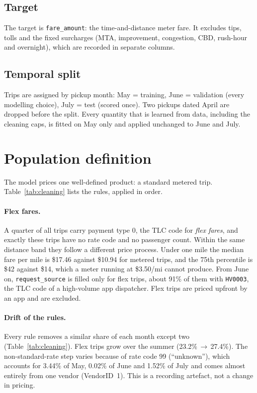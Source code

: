 \documentclass[11pt,a4paper]{article}
\newcommand{\usd}[1]{\$#1}%
\newcommand{\code}[1]{\texttt{#1}}
\begin{document}
\subsection{Target}
The target is \code{fare\_amount}: the time-and-distance meter fare. It excludes tips, tolls and the fixed surcharges (MTA, improvement, congestion, CBD, rush-hour and overnight), which are recorded in separate columns.

\subsection{Temporal split}
Trips are assigned by pickup month: May = training, June = validation (every modelling choice), July = test (scored once). Two pickups dated April are dropped before the split. Every quantity that is learned from data, including the cleaning caps, is fitted on May only and applied unchanged to June and July.

\section{Population definition}\label{sec:population}
The model prices one well-defined product: a standard metered trip. Table~\ref{tab:cleaning} lists the rules, applied in order.
\TableCleaning

\paragraph{Flex fares.} A quarter of all trips carry payment type 0, the TLC code for \emph{flex fares}, and exactly these trips have no rate code and no passenger count. Within the same distance band they follow a different price process. Under one mile the median fare per mile is \usd{17.46} against \usd{10.94} for metered trips, and the 75th percentile is \usd{42} against \usd{14}, which a meter running at \usd{3.50}/mi cannot produce. From June on, \code{request\_source} is filled only for flex trips, about 91\% of them with \code{HV0003}, the TLC code of a high-volume app dispatcher. Flex trips are priced upfront by an app and are excluded.

\paragraph{Drift of the rules.} Every rule removes a similar share of each month except two (Table~\ref{tab:cleaning}). Flex trips grow over the summer (23.2\%\,$\to$\,27.4\%). The non-standard-rate step varies because of rate code 99 (``unknown''), which accounts for 3.44\% of May, 0.02\% of June and 1.52\% of July and comes almost entirely from one vendor (VendorID~1). This is a recording artefact, not a change in pricing.
\end{document}
